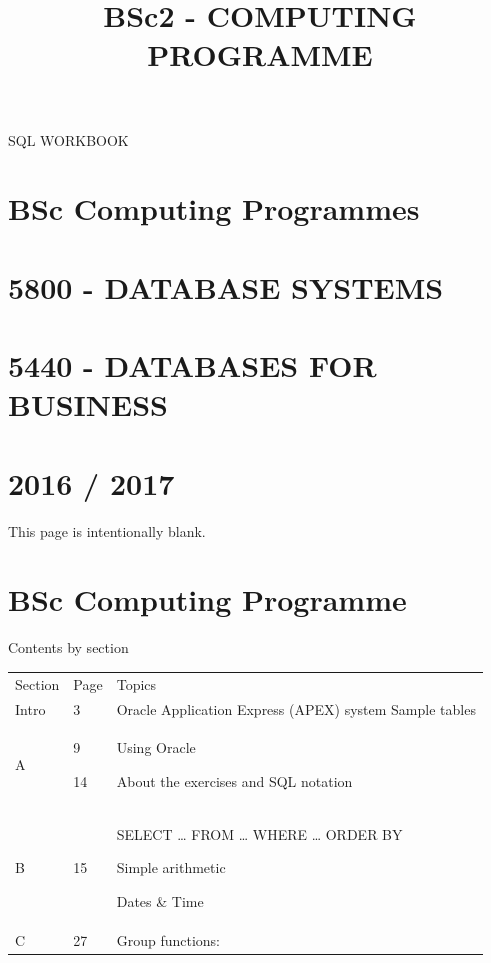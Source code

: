 \documentclass{report}
\title{BSc2 - COMPUTING PROGRAMME}
\begin{document}
\begin{flushleft}
{\selectfont

\clearpage

SQL WORKBOOK

\section[BSc Computing Programmes]{BSc Computing Programmes}
\section[5800 {}- DATABASE SYSTEMS]{5800 - DATABASE SYSTEMS}
\section[5440 {}- DATABASES FOR BUSINESS]{5440 - DATABASES FOR BUSINESS}

\section[2016 / 2017]{2016 / 2017}
This page is intentionally blank.

\clearpage
\section[BSc Computing Programme]{BSc Computing Programme}

\begin{center}

\begin{minipage}{13.25cm}
Contents by section

\begin{flushleft}
\tablefirsthead{}
\tablehead{}
\tabletail{}
\tablelasttail{}

\begin{supertabular}{m{2.1069999cm}m{1.433cm}m{21.439cm}}
Section & Page & Topics\\
\centering Intro & 3 & Oracle Application Express (APEX) system Sample tables\\
\centering A &
9

14 &
Using Oracle

About the exercises and SQL notation\\
\centering B &
15 &
SELECT {\dots} FROM {\dots} WHERE {\dots} ORDER BY

Simple arithmetic

Dates \& Time\\
\centering C &
27 &
Group functions:


\end{supertabular}
\end{flushleft}
\end{minipage}
\end{center}}
\end{flushleft}
\end{document}

